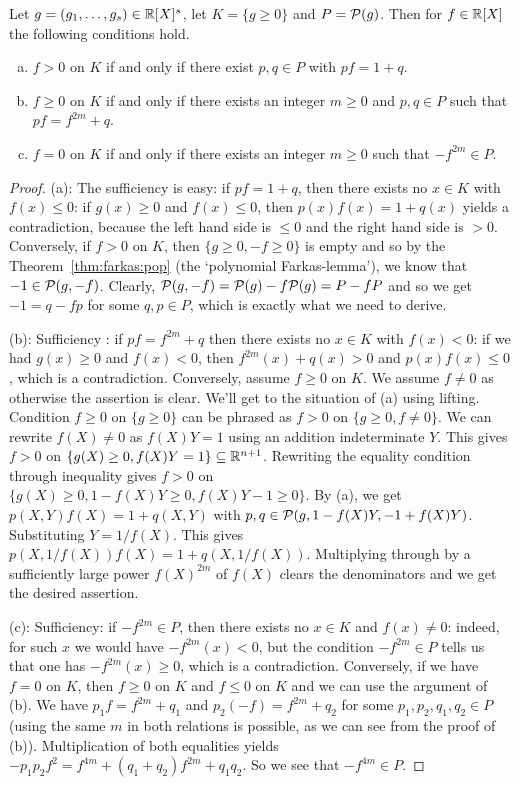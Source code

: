 \begin{theorem}
	\label{stellensaetze}
	Let $g = (g_1,\ldots,g_s) \in \mathbb{R}[X]^s$, let $K = \{ g \ge 0\}$ and $P= \mathcal{P}(g)$. Then for $f \in \mathbb{R}[X]$ the following conditions hold.
	\begin{enumerate}[(a)]
		\item $f>0$ on $K$ if and only if there exist $p, q \in P$ with $p f = 1+ q$. 
		\item $f \ge 0$ on $K$ if and only if there exists an integer $m \ge 0$ and $p, q \in P$ such that $p f = f^{2m} + q$. 
		\item $f=0$ on $K$ if and only if there exists an integer $m \ge 0$ such that $-f^{2m} \in P$. 
	\end{enumerate}
\end{theorem}
\begin{proof}
	(a): The sufficiency is easy: if $p f = 1+q$, then there exists no $x \in K$ with $f(x) \le 0$: if $g(x) \ge 0$ and $f(x) \le 0$, then $p(x) f(x) = 1+q(x)$ yields a contradiction, because the left hand side is $\le 0$ and the right hand side is $> 0$. Conversely,  if $f>0$ on $K$, then $\{ g \ge 0,-f \ge 0 \}$ is empty and so by the  Theorem~\ref{thm:farkas:pop} (the `polynomial Farkas-lemma'), we know that $-1 \in \mathcal{P}(g,-f)$. Clearly, $\mathcal{P}(g,-f) = \mathcal{P}(g) - f \mathcal{P}(g) = P - f P$ and so we get $-1 = q - f p$ for some $q, p \in P$, which is exactly what we need to derive. 
	
	(b): Sufficiency : if $p f = f^{2m} +q$ then there exists no $x \in K$ with $f(x) < 0$: if we had $g(x) \ge 0$ and $f(x) < 0$, then $f^{2m}(x) + q(x) > 0$ and $p(x) f(x) \le 0$, which is a contradiction. Conversely, assume $f \ge 0$ on $K$. We assume $f \ne 0$ as otherwise the assertion is clear. We'll get to the situation of (a) using lifting. Condition $f \ge 0$ on $\{g \ge 0\}$ can be phrased as $f > 0$ on $\{ g \ge 0, f \ne 0\}$. We can rewrite $f(X) \ne 0$ as $f(X) Y =1$ using an addition indeterminate $Y$. This gives $f > 0$ on $\{ g(X) \ge 0, f(X) Y =  1\} \subseteq \mathbb{R}^{n+1}$. Rewriting the equality condition through inequality gives $f> 0$ on $\{g(X) \ge 0, 1 - f(X) Y \ge 0, f(X) Y - 1 \ge 0\}$. By (a), we get 
	$p(X,Y) f(X) = 1+ q(X,Y) $ with $p, q \in \mathcal{P}(g,1-f(X) Y, -1 + f(X) Y)$. Substituting $Y = 1/f(X)$. This gives $p(X,1/f(X)) f(X) = 1 + q(X,1/f(X))$. Multiplying through by a sufficiently large power $f(X)^{2m}$ of $f(X)$ clears the denominators and we get the desired assertion. 
	
	(c): Sufficiency: if $- f^{2m} \in P$, then there exists no $x \in K$ and $f(x) \ne 0$: indeed, for such $x$ we would have $- f^{2m}(x) < 0$, but the condition $-f^{2m} \in P$ tells us that one has $-f^{2m}(x) \ge 0$, which is a contradiction. Conversely, if we have $f = 0$ on $K$, then $f \ge 0$ on $K$ and $f \le 0$ on $K$ and we can use the argument of (b). We have $p_1 f = f^{2m} + q_1$ and $p_2 (-f) = f^{2m} + q_2$ for some $p_1,p_2,q_1, q_2\in P$ (using the same $m$ in both relations is possible, as we can see from the proof of (b)). Multiplication of both equalities yields $-p_1 p_2 f^2 = f^{4m} + (q_1+q_2) f^{2m}  +q_1 q_2$. So we see that $-f^{4m} \in P$.   
\end{proof}

